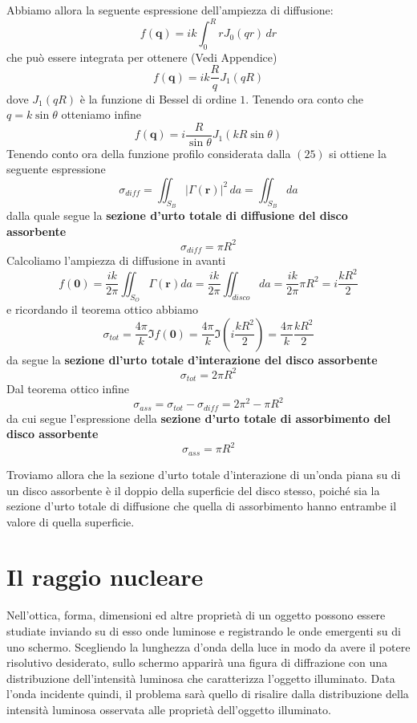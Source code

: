 Abbiamo allora la seguente espressione dell'ampiezza di diffusione:
\[
	f(\bm{q}) = ik \int_0^R r J_0(qr) \, dr
\] che può essere integrata per ottenere (Vedi Appendice)
\[
	f(\bm{q}) = ik \frac{R}{q} J_1(qR)
\]
dove \(J_1(qR)\) è la funzione di Bessel di ordine \(1\).
Tenendo ora conto che \(q = k \sin \theta\) otteniamo infine
\begin{equation}
	f(\bm{q}) = i \frac{R}{\sin \theta} J_1(kR \sin \theta)
\end{equation}
Tenendo conto ora della funzione profilo considerata dalla \((25)\) si ottiene la seguente espressione
\[
	\sigma_{diff} = \iint_{S_B} |\Gamma(\bm{r})|^2 \, da = \iint_{S_B} da
\]
dalla quale segue la \textbf{sezione d'urto totale di diffusione del disco assorbente}
\begin{equation}
	\sigma_{diff} = \pi R^2
\end{equation}
Calcoliamo l'ampiezza di diffusione in avanti
\[
	f(\bm{0}) = \frac{ik}{2 \pi} \iint_{S_O} \Gamma (\bm{r}) da = \frac{ik}{2 \pi} \iint_{disco} da = \frac{ik}{2 \pi}
	\pi R^2 = i \frac{kR^2}{2}
\] e ricordando il teorema ottico abbiamo
\[
	\sigma_{tot} = \frac{4 \pi}{k} \Im f(\bm{0}) = \frac{4 \pi}{k} \Im \left(i  \frac{kR^2}{2}\right) = \frac{4 \pi}{k}\frac{kR^2}{2}
\]
da segue la \textbf{sezione dl'urto totale d'interazione del disco assorbente}
\begin{equation}
	\sigma_{tot} = 2 \pi R^2
\end{equation}
Dal teorema ottico infine
\[
	\sigma_{ass} = \sigma_{tot} - \sigma_{diff} = 2\pi ^2 - \pi R^2
\] da cui segue l'espressione della \textbf{sezione d'urto totale di
assorbimento del disco assorbente}
\begin{equation}
	\sigma_{ass} = \pi R^2
\end{equation}

Troviamo allora che la sezione d'urto totale d'interazione di un'onda
piana su di un disco assorbente è il doppio della superficie del disco
stesso, poiché sia la sezione d'urto totale di diffusione che quella di
assorbimento hanno entrambe il valore di quella superficie.
\section{Il raggio nucleare}\label{sec:raggio-nucleare}
Nell'ottica, forma, dimensioni ed altre proprietà di un oggetto possono
essere studiate inviando su di esso onde luminose e registrando le onde
emergenti su di uno schermo. Scegliendo la lunghezza d'onda della luce
in modo da avere il potere risolutivo desiderato, sullo schermo apparirà
una figura di diffrazione con una distribuzione dell'intensità luminosa
che caratterizza l'oggetto illuminato. Data l'onda incidente quindi, il
problema sarà quello di risalire dalla distribuzione della intensità
luminosa osservata alle proprietà dell'oggetto illuminato.

